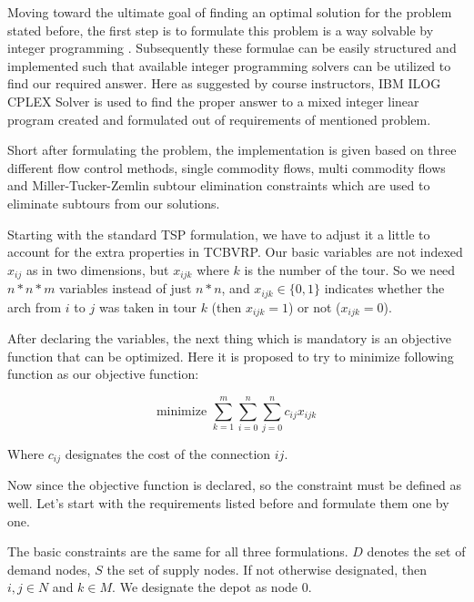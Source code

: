 Moving toward the ultimate goal of finding an optimal solution for the problem
stated before, the first step is to formulate this problem is a way solvable by
integer programming \cite{garfinkel1972integer}. Subsequently these formulae can be easily structured
and implemented such that available integer programming solvers can be utilized to
find our required answer. Here as suggested by course instructors, IBM ILOG
CPLEX Solver \cite{cplex2009v12}
is used to find the proper answer to a mixed integer linear program created and
formulated out of requirements of mentioned problem.

Short after formulating the problem, the implementation is given based on three
different flow control methods, single commodity flows, multi commodity flows
and Miller-Tucker-Zemlin subtour elimination constraints which are used to
eliminate subtours from our solutions.

Starting with the standard TSP \cite{miller1960integer} formulation, we have to adjust it a
little to account for the extra properties in TCBVRP. Our basic variables are not
indexed $x_{ij}$ as in two dimensions, but $x_{ijk}$ where $k$ is the number
of the tour. So we need $n*n*m$ variables instead of just $n*n$, and $x_{ijk} \in \{0,1\}$
indicates whether the arch from $i$ to $j$ was taken in tour $k$ (then $x_{ijk} = 1$) or
not ($x_{ijk} = 0$).

After declaring the variables, the next thing which is mandatory is an objective function 
that can be optimized. Here it is proposed to try to minimize following function as our
objective function:

\begin{equation}
\mbox{minimize }\sum_{k = 1}^{m} \sum_{i = 0}^{n} \sum_{j = 0}^{n} c_{ij} x_{ijk}
\end{equation}

Where $c_{ij}$ designates the cost of the connection $ij$.

Now since the objective function is declared, so the constraint must be defined
as well. Let's start with the requirements listed before and formulate them one
by one.

The basic constraints are the same for all three formulations. $D$ denotes the
set of demand nodes, $S$ the set of supply nodes. If not otherwise designated,
then $i, j \in N$ and $k \in M$. We designate the depot as node $0$.

